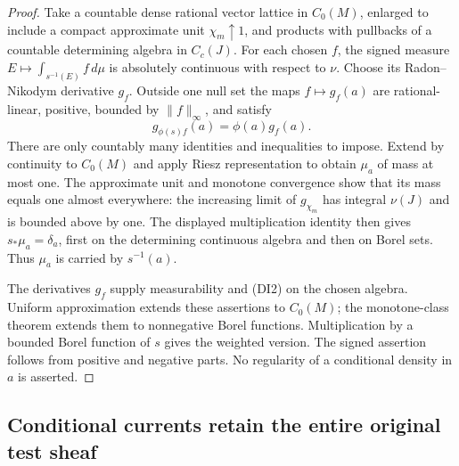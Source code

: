 \documentclass[11pt,a4paper]{article}
\numberwithin{equation}{section}
\theoremstyle{definition}
\theoremstyle{remark}
\begin{document}
\begin{proof}
Take a countable dense rational vector lattice in $C_0(M)$, enlarged
to include a compact approximate unit $\chi_m\uparrow1$, and products
with pullbacks of a countable determining algebra in $C_c(J)$.
For each chosen $f$, the signed measure
$E\mapsto\int_{s^{-1}(E)}f\,d\mu$ is absolutely continuous with
respect to $\nu$. Choose its Radon--Nikodym derivative $g_f$.
Outside one null set the maps $f\mapsto g_f(a)$ are rational-linear,
positive, bounded by $\|f\|_\infty$, and satisfy
\[
                  g_{\phi(s)f}(a)=\phi(a)g_f(a).
\]
There are only countably many identities and inequalities to impose.
Extend by continuity to $C_0(M)$ and apply Riesz representation to
obtain $\mu_a$ of mass at most one. The approximate unit and
monotone convergence show that its mass equals one almost everywhere:
the increasing limit of $g_{\chi_m}$ has integral $\nu(J)$ and is
bounded above by one. The displayed multiplication identity then
gives $s_*\mu_a=\delta_a$, first on the determining continuous
algebra and then on Borel sets. Thus $\mu_a$ is carried by
$s^{-1}(a)$.

The derivatives $g_f$ supply measurability and (DI2) on the chosen
algebra. Uniform approximation extends these assertions to
$C_0(M)$; the monotone-class theorem extends them to nonnegative
Borel functions. Multiplication by a bounded Borel function of
$s$ gives the weighted version. The signed assertion follows from
positive and negative parts. No regularity of a conditional density
in $a$ is asserted.
\end{proof}

\subsection{Conditional currents retain the entire original test sheaf}
\end{document}
